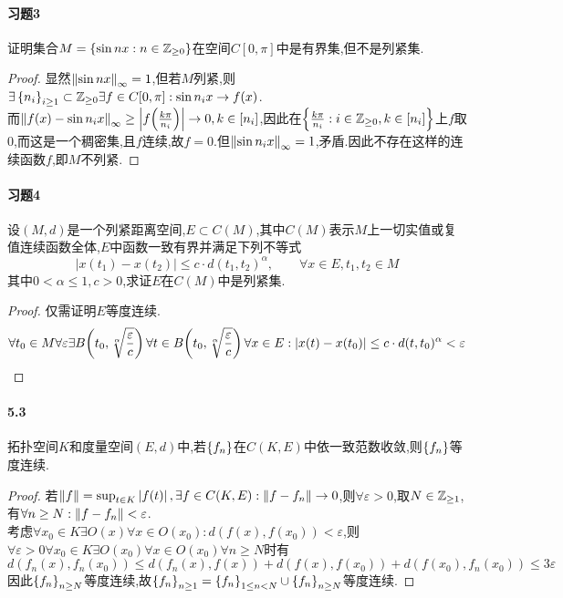 \documentclass[UTF8]{article}
\begin{document}
\paragraph*{习题3}证明集合$M=\left\{\sin nx:n\in \mathbb{Z}_{\geq 0}\right\}$在空间$C[0,\pi]$中是有界集,但不是列紧集.
\begin{proof}
    显然$\left\|\sin nx\right\|_\infty=1$,但若$M$列紧,则$\exists \left\{n_i\right\}_{i\geq 1}\subset \mathbb{Z}_{\geq 0}\exists f\in C[0,\pi]:\sin n_ix\to f(x)$.\\
    而$\left\|f(x)-\sin n_ix\right\|_\infty\geq \left|f\!\left(\frac{k\pi}{n_i}\right)\right|\to 0, k\in [n_i]$,因此在$\left\{\frac{k\pi}{n_i}:i\in \mathbb{Z}_{\geq 0},k\in [n_i]\right\}$上$f$取0,而这是一个稠密集,且$f$连续,故$f=0$.但$\left\|\sin n_ix\right\|_\infty=1$,矛盾.因此不存在这样的连续函数$f$,即$M$不列紧.
\end{proof}

\paragraph*{习题4}设$(M,d)$是一个列紧距离空间,$E\subset C(M)$,其中$C(M)$表示$M$上一切实值或复值连续函数全体,$E$中函数一致有界并满足下列不等式
$$|x(t_1)-x(t_2)|\leq c\cdot d(t_1,t_2)^\alpha,\qquad \forall x\in E, t_1,t_2\in M$$
其中$0<\alpha\leq 1,c>0$,求证$E$在$C(M)$中是列紧集.
\begin{proof}
    仅需证明$E$等度连续.$$\forall t_0\in M\forall\varepsilon\exists B\!\left(t_0,\sqrt[\alpha]{\frac{\varepsilon}{c}}\right)\forall t\in B\!\left(t_0,\sqrt[\alpha]{\frac{\varepsilon}{c}}\right)\forall x\in E:\left|x(t)-x(t_0)\right|\leq c\cdot d(t,t_0)^\alpha<\varepsilon$$
\end{proof}

\paragraph*{5.3}拓扑空间$K$和度量空间$(E,d)$中,若$\left\{f_n\right\}$在$C(K,E)$中依一致范数收敛,则$\left\{f_n\right\}$等度连续.
\begin{proof}
    若$\left\|f\right\|=\sup_{t\in K}\left|f(t)\right|, \exists f\in C(K,E):\left\|f-f_n\right\|\to 0$,则$\forall \varepsilon>0$,取$N\in \mathbb{Z}_{\geq 1}$,有$\forall n\geq N:\left\|f-f_n\right\|<\varepsilon$.\\
    考虑$\forall x_0\in K\exists O(x)\forall x\in O(x_0):d(f(x),f(x_0))<\varepsilon$,则$\forall \varepsilon>0\forall x_0\in K\exists O(x_0)\forall x\in O(x_0)\forall n\geq N$时有$$d(f_n(x),f_n(x_0))\leq d(f_n(x),f(x))+d(f(x),f(x_0))+d(f(x_0),f_n(x_0))\leq 3\varepsilon$$
    因此$\left\{f_n\right\}_{n\geq N}$等度连续,故$\left\{f_n\right\}_{n\geq 1}=\left\{f_n\right\}_{1\leq n< N}\cup \left\{f_n\right\}_{n\geq N}$等度连续.
\end{proof}
\end{document}
